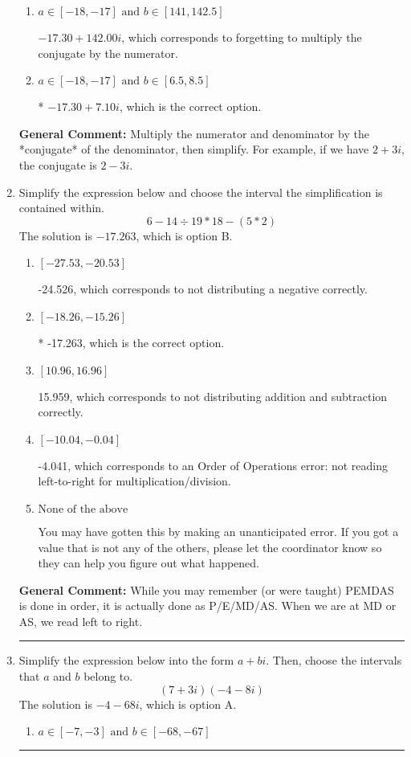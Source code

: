 \documentclass{extbook}[14pt]
\newcommand{\litem}[1]{\item #1

\rule{\textwidth}{0.4pt}}
\begin{document}
\begin{enumerate}
{\begin{enumerate}[label=\Alph*.]
 $4.70  - 18.10 i$, which corresponds to forgetting to multiply the conjugate by the numerator and not computing the conjugate correctly.
\item \( a \in [-18, -17] \text{ and } b \in [141, 142.5] \)

 $-17.30  + 142.00 i$, which corresponds to forgetting to multiply the conjugate by the numerator.
\item \( a \in [-18, -17] \text{ and } b \in [6.5, 8.5] \)

* $-17.30  + 7.10 i$, which is the correct option.
\end{enumerate}

\textbf{General Comment:} Multiply the numerator and denominator by the *conjugate* of the denominator, then simplify. For example, if we have $2+3i$, the conjugate is $2-3i$.
}
\litem{
Simplify the expression below and choose the interval the simplification is contained within.
\[ 6 - 14 \div 19 * 18 - (5 * 2) \]The solution is \( -17.263 \), which is option B.\begin{enumerate}[label=\Alph*.]
\item \( [-27.53, -20.53] \)

 -24.526, which corresponds to not distributing a negative correctly.
\item \( [-18.26, -15.26] \)

* -17.263, which is the correct option.
\item \( [10.96, 16.96] \)

 15.959, which corresponds to not distributing addition and subtraction correctly.
\item \( [-10.04, -0.04] \)

 -4.041, which corresponds to an Order of Operations error: not reading left-to-right for multiplication/division.
\item \( \text{None of the above} \)

 You may have gotten this by making an unanticipated error. If you got a value that is not any of the others, please let the coordinator know so they can help you figure out what happened.
\end{enumerate}

\textbf{General Comment:} While you may remember (or were taught) PEMDAS is done in order, it is actually done as P/E/MD/AS. When we are at MD or AS, we read left to right.
}
\litem{
Simplify the expression below into the form $a+bi$. Then, choose the intervals that $a$ and $b$ belong to.
\[ (7 + 3 i)(-4 - 8 i) \]The solution is \( -4 - 68 i \), which is option A.\begin{enumerate}[label=\Alph*.]
\item \( a \in [-7, -3] \text{ and } b \in [-68, -67] \)


\end{enumerate}}
\end{enumerate}
\end{document}
